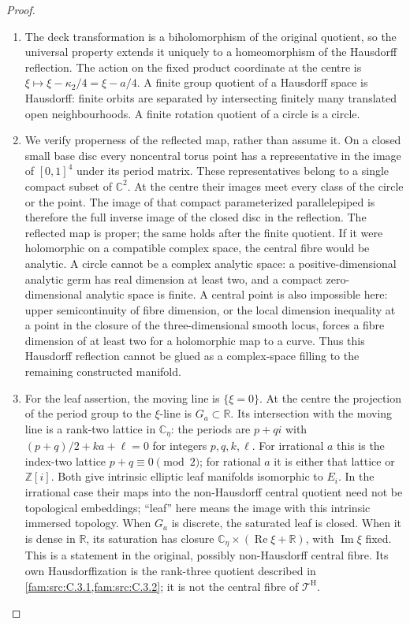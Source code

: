 \begin{proof}
\begin{enumerate}[label=\arabic*.,leftmargin=*]
\item The deck transformation is a biholomorphism of the original quotient,
so the universal property extends it uniquely to a homeomorphism of
the Hausdorff reflection. The action on the fixed product coordinate
at the centre is \(\xi\mapsto\xi-\kappa_2/4=\xi-a/4\).
A finite group quotient of a Hausdorff space is Hausdorff: finite
orbits are separated by intersecting finitely many translated open
neighbourhoods. A finite rotation quotient of a circle is a circle.

\item We verify properness of the reflected map, rather than assume it.
On a closed small base disc every noncentral torus point has a
representative in the image of \([0,1]^4\) under its period matrix.
These representatives belong to a single compact subset of
\(\mathbb C^2\). At the centre their images meet every class of the
circle or the point. The image of that compact parameterized
parallelepiped is therefore the full inverse image of the closed
disc in the reflection. The reflected map is proper; the same holds
after the finite quotient. If it were holomorphic on a compatible
complex space, the central fibre would be analytic. A circle cannot
be a complex analytic space: a positive-dimensional analytic germ
has real dimension at least two, and a compact zero-dimensional
analytic space is finite. A central point is also impossible here:
upper semicontinuity of fibre dimension, or the local dimension
inequality at a point in the closure of the three-dimensional smooth
locus, forces a fibre dimension of at least two for a holomorphic
map to a curve. Thus this Hausdorff reflection cannot be glued as a
complex-space filling to the remaining constructed manifold.

\item For the leaf assertion, the moving line is \(\{\xi=0\}\).
At the centre the projection of the period group to the \(\xi\)-line
is \(G_a\subset\mathbb R\). Its intersection with the moving line
is a rank-two lattice in \(\mathbb C_\eta\): the periods are
\(p+qi\) with \((p+q)/2+ka+\ell=0\) for integers
\(p,q,k,\ell\). For irrational \(a\) this is the index-two lattice
\(p+q\equiv0\pmod2\); for rational \(a\) it is either that lattice
or \(\mathbb Z[i]\). Both give intrinsic elliptic leaf manifolds isomorphic to
\(E_i\). In the irrational case their maps into the non-Hausdorff
central quotient need not be topological embeddings; ``leaf'' here
means the image with this intrinsic immersed topology. When \(G_a\)
is discrete, the saturated leaf is closed.
When it is dense in \(\mathbb R\), its saturation has closure
\(\mathbb C_\eta\times(\operatorname{Re}\xi+\mathbb R)\), with
\(\operatorname{Im}\xi\) fixed. This is a statement in the original,
possibly non-Hausdorff central fibre. Its own Hausdorffization is the
rank-three quotient described in \cref{fam:src:C.3.1,fam:src:C.3.2}; it is not the central fibre of
\(\mathcal T^{\mathrm H}\).
\end{enumerate}
\end{proof}

